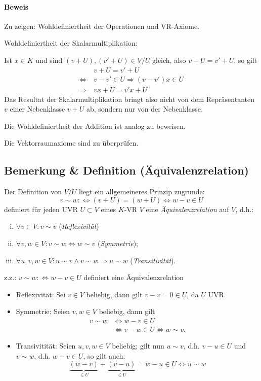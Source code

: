 \paragraph{Beweis}
	Zu zeigen: Wohldefiniertheit der Operationen und VR-Axiome.
	
	Wohldefiniertheit der Skalarmultiplikation:
	
	Ist $x\in K$ und sind $(v+U),(v'+U)\in V/U$ gleich, also $v+U = v'+U$, so gilt
		\begin{align*}
		&v+U = v'+U \\
		\Leftrightarrow\ & v - v'\in U \Rightarrow (v-v')x \in U \\
		\Rightarrow\ & vx+U=v' x+U
		\end{align*}
	Das Resultat der Skalarmultiplikation bringt also nicht von dem Repräsentanten $v$ einer Nebenklasse $v+U$ ab, sondern nur von der Nebenklasse.
	
	Die Wohldefiniertheit der Addition ist analog zu beweisen.
	
	Die Vektorraumaxiome sind zu überprüfen.

\subsection{Bemerkung \& Definition (Äquivalenzrelation)}
	\begin{Definition}[Äquivalenzrelation]
		Der Definition von $ V/U $ liegt ein allgemeineres Prinzip zugrunde:	
		\[ v\sim w :\Leftrightarrow (v+U)= (w+U) \Leftrightarrow w-v \in U \]
	definiert für jeden UVR $ U\subset V $ eines $ K $-VR $ V $ eine \emph{Äquivalenzrelation} auf $ V $, d.h.:
		\begin{enumerate}[(i)]
			\item $ \forall v\in V: v\sim v $ (\emph{Reflexivität})
			\item $ \forall v,w\in V: v\sim w\Leftrightarrow w\sim v $ (\emph{Symmetrie});
			\item $ \forall u,v,w\in V: u\sim v\land v\sim w\Rightarrow u\sim w $ (\emph{Transitivität}).
		\end{enumerate}
	\end{Definition}

        z.z.: $ v\sim w:\Leftrightarrow w-v\in U $ definiert eine Äquivalenzrelation
	
	\begin{itemize}
		\item Reflexivität: Sei $ v\in V $ beliebig, dann gilt $ v-v=0\in U $, da $ U $ UVR.
		\item Symmetrie: Seien $ v,w\in V $ beliebig, dann gilt
			\begin{align*}
			v\sim w 	&\Leftrightarrow w-v\in U\\
						&\Leftrightarrow v-w\in U \Leftrightarrow w\sim v.
			\end{align*}
		\item Transivitität: Seien $ u,v,w\in V $ beliebig; gilt nun
			$u\sim v$, d.h. $v-u\in U$ und $v\sim w$, d.h. $w-v\in U$, so gilt auch:
			\[\underbrace{(w-v)}_{\in U}+\underbrace{(v-u)}_{\in U}= w-u\in U \Leftrightarrow u\sim w\]
	\end{itemize}
	
